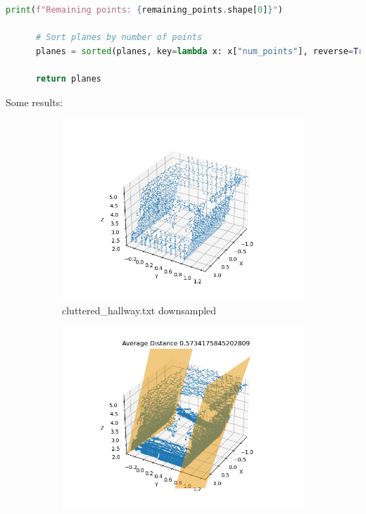 \documentclass[conference,onecolumn]{IEEEtran}
\begin{document}
\begin{enumerate}[label=\arabic{enumi}.]
\begin{enumerate}
\begin{lstlisting}[language=Python]
                  print(f"Remaining points: {remaining_points.shape[0]}")

      # Sort planes by number of points
      planes = sorted(planes, key=lambda x: x["num_points"], reverse=True)

      return planes
                        \end{lstlisting}
                        Some results:
                        \begin{figure}[H]
                              \centering
                              \begin{subfigure}{.49\linewidth}
                                    \includegraphics[width=.99\linewidth]{figs/Q4_cluttered_hallway_downsampled.png}
                                    \caption{cluttered\_hallway.txt downsampled}
                              \end{subfigure}
                              \begin{subfigure}{.49\linewidth}
                                    \includegraphics[width=.99\linewidth]{figs/Q4_cluttered_hallway_planes.png}

\end{subfigure}
\end{figure}
\end{enumerate}
\end{enumerate}
\end{document}
